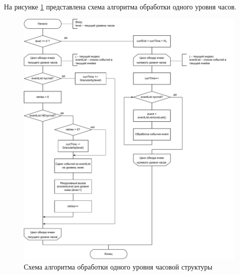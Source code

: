 \documentclass{bmstu}
\begin{document}
\clearpage
На рисунке \ref{img:hybrid_processLevel_schema} представлена схема алгоритма обработки одного уровня часов.
\begin{figure}[h!btp]
	\centering
	\includegraphics[width=1\columnwidth]{inc/img/hybrid_processLevel_schema.pdf}
	\caption{Схема алгоритма обработки одного уровня часовой структуры}
	\label{img:hybrid_processLevel_schema}	
\end{figure}
\end{document}
